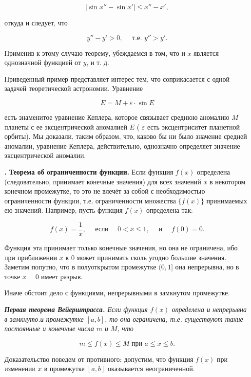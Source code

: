 \documentclass[10pt, twoside]{article}
\newcounter{subtopic}
\newcommand{\subtopic}[1]{%
  \stepcounter{subtopic}%
  \gdef\thesubtopic{\arabic{subtopic}}
  \textbf{\arabic{subtopic}. #1}
}
\begin{document}
$$
  \left|\sin x''-\sin x'\right| \leqslant x''-x',
$$

откуда и следует, что

$$
  y''-y'>0, \quad \text { т.е. } y''>y' .
$$

Применив к этому случаю теорему, убеждаемся в том, что и $x$ является однозначной функцией от $y$, и т. д.

Приведенный пример представляет интерес тем, что соприкасается с одной задачей теоретической астрономии. Уравнение


\begin{equation*}
  E=M+\varepsilon \cdot \sin E \tag{3a}
\end{equation*}


есть знаменитое уравнение Кеплера, которое связывает среднюю аномалию $M$ планеты с ее эксцентрической аномалией $E$ ( $\varepsilon$ есть эксцентриситет планетной орбиты). Мы доказали, таким образом, что, каково бы ни было значение средней аномалии, уравнение Кеплера, действительно, однозначно определяет значение эксцентрической аномалии.

\subtopic{Теорема об ограниченности функции.} Если функция $f(x)$ определена (следовательно, принимает конечные значения) для всех значений $x$ в некотором конечном промежутке, то это не влечёт за собой с необходимостью ограниченности функции, т.е. ограниченности множества $\{f(x)\}$ принимаемых ею значений. Например, пусть функция $f(x)$ определена так:

$$
  f(x)=\frac{1}{x}, \quad \text { если } \quad 0<x \leqslant 1, \quad \text { и } \quad f(0)=0 .
$$

Функция эта принимает только конечные значения, но она не ограничена, ибо при приближении $x$ к $0$ может принимать сколь угодно большие значения. Заметим попутно, что в полуоткрытом промежутке $(0,1]$ она непрерывна, но в точке $x=0$ имеет разрыв.

Иначе обстоит дело с функциями, непрерывными в замкнутом промежутке.

\textit{\textbf{Первая теорема Вейерштрасса.} Если функция $f(x)$ определена и непрерывна в замкнуто.и промежутке $[a, b]$, то она ограничена, т.е. существуют такие постоянные и конечные числа $m$ и $M$, что}

  $$
    m \leqslant f(x) \leqslant M \text{ при } a \leqslant x \leqslant b .
  $$

Доказательство поведем от противного: допустим, что функция $f(x)$ при изменении $x$ в промежутке $[a, b]$ оказывается неограниченной.
\end{document}
